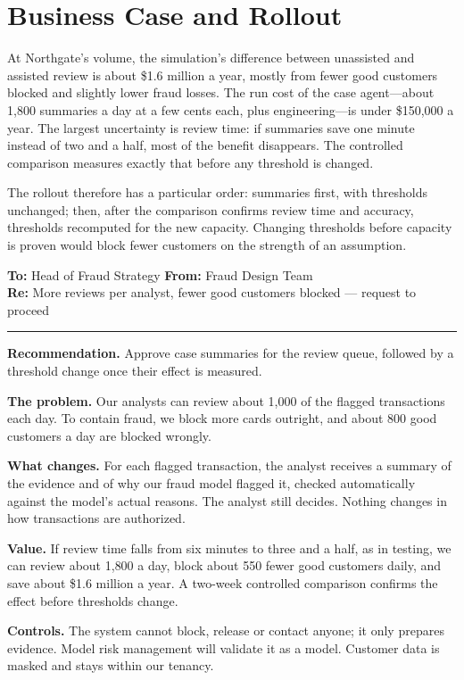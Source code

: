 \section{Business Case and Rollout}
\label{sec:fr-business}

At Northgate's volume, the simulation's difference between unassisted and assisted review is about \$1.6 million a year, mostly from fewer good customers blocked and slightly lower fraud losses. The run cost of the case agent---about 1{,}800 summaries a day at a few cents each, plus engineering---is under \$150{,}000 a year. The largest uncertainty is review time: if summaries save one minute instead of two and a half, most of the benefit disappears. The controlled comparison measures exactly that before any threshold is changed.

The rollout therefore has a particular order: summaries first, with thresholds unchanged; then, after the comparison confirms review time and accuracy, thresholds recomputed for the new capacity. Changing thresholds before capacity is proven would block fewer customers on the strength of an assumption.

\begin{tcolorbox}[colback=white, colframe=black!60, boxrule=0.6pt, arc=1pt, left=10pt, right=10pt, top=8pt, bottom=8pt, fontupper=\small]
\textbf{To:} Head of Fraud Strategy \hfill \textbf{From:} Fraud Design Team\\
\textbf{Re:} More reviews per analyst, fewer good customers blocked --- request to proceed

\smallskip\hrule\smallskip

\textbf{Recommendation.} Approve case summaries for the review queue, followed by a threshold change once their effect is measured.

\textbf{The problem.} Our analysts can review about 1{,}000 of the flagged transactions each day. To contain fraud, we block more cards outright, and about 800 good customers a day are blocked wrongly.

\textbf{What changes.} For each flagged transaction, the analyst receives a summary of the evidence and of why our fraud model flagged it, checked automatically against the model's actual reasons. The analyst still decides. Nothing changes in how transactions are authorized.

\textbf{Value.} If review time falls from six minutes to three and a half, as in testing, we can review about 1{,}800 a day, block about 550 fewer good customers daily, and save about \$1.6 million a year. A two-week controlled comparison confirms the effect before thresholds change.

\textbf{Controls.} The system cannot block, release or contact anyone; it only prepares evidence. Model risk management will validate it as a model. Customer data is masked and stays within our tenancy.
\end{tcolorbox}

